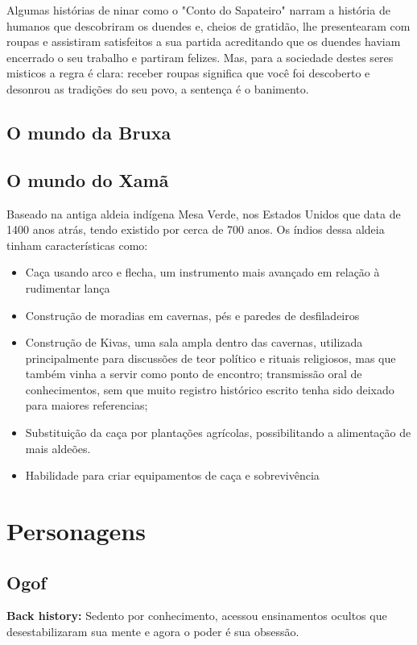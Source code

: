 Algumas histórias de ninar como o "Conto do Sapateiro" narram a história de humanos que descobriram os duendes e, cheios de gratidão, lhe presentearam com roupas e assistiram satisfeitos a sua partida acreditando que os duendes haviam encerrado o seu trabalho e partiram felizes. Mas, para a sociedade destes seres misticos a regra é clara: receber roupas significa que você foi descoberto e desonrou as tradições do seu povo, a sentença é o banimento. 

\subsection{O mundo da Bruxa}
\subsection{O mundo do Xamã}
Baseado na antiga aldeia indígena Mesa Verde, nos Estados Unidos que data de 1400 anos atrás, tendo existido por cerca de 700 anos. Os índios dessa aldeia tinham características como: 

\begin{itemize}
\item Caça usando arco e flecha, um instrumento mais avançado em relação à rudimentar lança
\item Construção de moradias em cavernas, pés e paredes de desfiladeiros
\item Construção de Kivas, uma sala ampla dentro das cavernas, utilizada principalmente para discussões de teor político e rituais religiosos, mas que também vinha a servir como ponto de encontro; transmissão oral de conhecimentos, sem que muito registro histórico escrito tenha sido deixado para maiores referencias;
\item Substituição da caça por plantações agrícolas, possibilitando a alimentação de mais aldeões.
\item Habilidade para criar equipamentos de caça e sobrevivência 
\end{itemize}

\section{Personagens}
\subsection{Ogof}
\textbf{Back history: }Sedento por conhecimento, acessou ensinamentos ocultos que desestabilizaram sua mente e agora o poder é sua obsessão.

